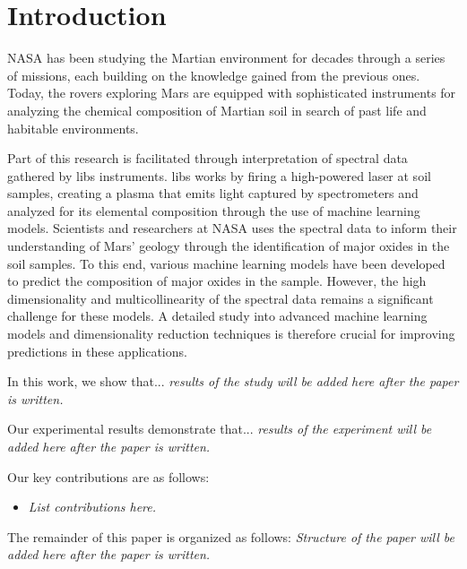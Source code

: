\section{Introduction}\label{sec:introduction}

NASA has been studying the Martian environment for decades through a series of missions, each building on the knowledge gained from the previous ones.
Today, the rovers exploring Mars are equipped with sophisticated instruments for analyzing the chemical composition of Martian soil in search of past life and habitable environments.

Part of this research is facilitated through interpretation of spectral data gathered  by \gls{libs} instruments.
\gls{libs} works by firing a high-powered laser at soil samples, creating a plasma that emits light captured by spectrometers and analyzed for its elemental composition through the use of machine learning models.
Scientists and researchers at NASA uses the spectral data to inform their understanding of Mars' geology through the identification of major oxides in the soil samples.
To this end, various machine learning models have been developed to predict the composition of major oxides in the sample.
However, the high dimensionality and multicollinearity of the spectral data remains a significant challenge for these models.
A detailed study into advanced machine learning models and dimensionality reduction techniques is therefore crucial for improving predictions in these applications.


In this work, we show that... \textit{results of the study will be added here after the paper is written.}

Our experimental results demonstrate that... \textit{results of the experiment will be added here after the paper is written.}

Our key contributions are as follows:
\begin{itemize}
	\item \textit{List contributions here.}
\end{itemize}


The remainder of this paper is organized as follows:
\textit{Structure of the paper will be added here after the paper is written.}
